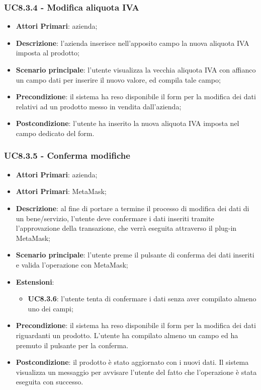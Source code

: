 \subsubsection{UC8.3.4 - Modifica aliquota IVA}
\begin{itemize}
	\item \textbf{Attori Primari}: azienda;
	\item \textbf{Descrizione}: l'azienda inserisce nell'apposito campo la 
	nuova aliquota IVA imposta al prodotto;
	\item \textbf{Scenario principale}: l'utente visualizza la vecchia aliquota IVA con affianco un campo dati per inserire il nuovo valore, ed compila 
	tale campo;
	\item \textbf{Precondizione}: il sistema ha reso disponibile il form per la modifica dei dati relativi ad un prodotto messo in vendita dall'azienda;
	\item \textbf{Postcondizione}: l'utente ha inserito la nuova aliquota IVA imposta nel campo dedicato del form.
\end{itemize}

\subsubsection{UC8.3.5 - Conferma modifiche}
\begin{itemize}
	\item \textbf{Attori Primari}: azienda;
	\item \textbf{Attori Primari}: MetaMask\glo;
	\item \textbf{Descrizione}: al fine di portare a termine il processo di modifica dei dati di un bene/servizio, l'utente deve confermare i dati inseriti tramite l'approvazione della transazione, che verrà eseguita attraverso il plug-in MetaMask\glo;
	\item \textbf{Scenario principale}: l'utente preme il pulsante di conferma dei dati inseriti e valida l'operazione con MetaMask\glo;
	\item \textbf{Estensioni}:
	\begin{itemize}
		\item \textbf{UC8.3.6}: l'utente tenta di confermare i dati senza aver compilato almeno uno dei campi;
	\end{itemize}
	\item \textbf{Precondizione}: il sistema ha reso disponibile il form per la modifica dei dati riguardanti un prodotto. L'utente ha compilato almeno un campo ed ha premuto il pulsante per la conferma.
	\item \textbf{Postcondizione}: il prodotto è stato aggiornato con i nuovi dati. Il sistema visualizza un messaggio per avvisare l'utente del fatto che l'operazione è stata eseguita con successo.
\end{itemize}


